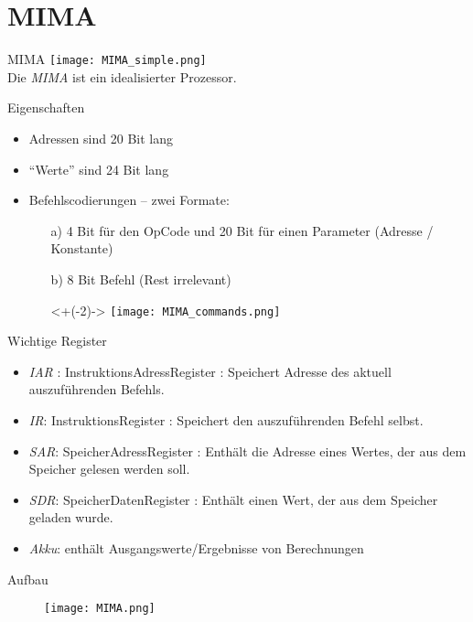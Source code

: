 \section{MIMA}

\begin{frame}{MIMA}
	\texttt{[image: MIMA\_simple.png]}\\
	Die \emph{MIMA} ist ein idealisierter Prozessor. 
\end{frame}

\begin{frame}{Eigenschaften}
	\begin{itemize}[<+->]
		\item Adressen sind 20 Bit lang
		\item \enquote{Werte} sind 24 Bit lang
		\item Befehlscodierungen -- zwei Formate:
		\begin{itemize}
			\item[a)] 4 Bit für den OpCode und 20 Bit für einen Parameter (Adresse / Konstante)
			\item[b)] 8 Bit Befehl (Rest irrelevant)\\
			\item[]<+(-2)-> \texttt{[image: MIMA\_commands.png]} 
		\end{itemize} 
	\end{itemize}
\end{frame}


\begin{frame}{Wichtige Register}
	\begin{itemize}[<+->]
		\item \emph{IAR} : InstruktionsAdressRegister : Speichert Adresse des aktuell auszuführenden Befehls.
		\item \emph{IR}: InstruktionsRegister : Speichert den auszuführenden Befehl selbst.
		\item \emph{SAR}: SpeicherAdressRegister : Enthält die Adresse eines Wertes, der aus dem Speicher gelesen werden soll.
		\item \emph{SDR}: SpeicherDatenRegister : Enthält einen Wert, der aus dem Speicher geladen wurde.
		\item \emph{Akku}: enthält Ausgangswerte/Ergebnisse von Berechnungen
	\end{itemize}
\end{frame}

\begin{frame}[t]{Aufbau}
	\begin{figure}
		\centering
		\texttt{[image: MIMA.png]}
	\end{figure}
\end{frame}


